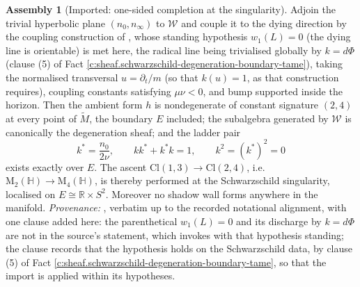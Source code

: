 \documentclass[11pt]{article}
\theoremstyle{definition}
\newtheorem{assembled}[theorem]{Assembly}
\theoremstyle{plain}
\providecommand{\Cl}{}\renewcommand{\Cl}{\mathrm{Cl}}
\providecommand{\HH}{}\renewcommand{\HH}{\mathbb{H}}
\providecommand{\Mat}{}\renewcommand{\Mat}{\mathrm{M}}
\providecommand{\Mt}{}\renewcommand{\Mt}{\widetilde{M}}
\providecommand{\R}{}\renewcommand{\R}{\mathbb{R}}
\providecommand{\nInf}{}\renewcommand{\nInf}{n_\infty}
\providecommand{\nO}{}\renewcommand{\nO}{n_0}
\providecommand{\shL}{}\renewcommand{\shL}{L}
\providecommand{\shW}{}\renewcommand{\shW}{\mathcal{W}}
\begin{document}
\begin{assembled}[Imported: one-sided completion at the singularity]\label{c:singularity.imported-one-sided-completion-singularity}
Adjoin the trivial hyperbolic plane $(\nO, \nInf)$ to $\shW$ and couple it to the dying direction by the coupling construction of \cite[Def.~4.1]{ButlerT4}, whose standing hypothesis $w_1(\shL) = 0$ (the dying line is orientable) is met here, the radical line being trivialised globally by $k = d\Phi$ (clause (5) of Fact \ref{c:sheaf.schwarzschild-degeneration-boundary-tame}), taking the normalised transversal $u = \partial_t/m$ (so that $k(u) = 1$, as that construction requires), coupling constants satisfying $\mu\nu < 0$, and bump supported inside the horizon. Then the ambient form $h$ is nondegenerate of constant signature $(2,4)$ at every point of $\Mt$, the boundary $E$ included; the subalgebra generated by $\shW$ is canonically the degeneration sheaf; and the ladder pair
\[
k^* = \frac{\nO}{2\nu}, \qquad k k^* + k^* k = 1, \qquad k^2 = (k^*)^2 = 0
\]
exists exactly over $E$. The ascent $\Cl(1,3) \to \Cl(2,4)$, i.e.\ $\Mat_2(\HH) \to \Mat_4(\HH)$, is thereby performed at the Schwarzschild singularity, localised on $E \cong \R \times S^2$. Moreover no shadow wall forms anywhere in the manifold.
\emph{Provenance:} \cite[Thm.~8.12]{ButlerT4}, verbatim up to the recorded notational alignment, with one clause added here: the parenthetical $w_1(\shL) = 0$ and its discharge by $k = d\Phi$ are not in the source's statement, which invokes \cite[Def.~4.1]{ButlerT4} with that hypothesis standing; the clause records that the hypothesis holds on the Schwarzschild data, by clause (5) of Fact \ref{c:sheaf.schwarzschild-degeneration-boundary-tame}, so that the import is applied within its hypotheses.
\end{assembled}
\end{document}
